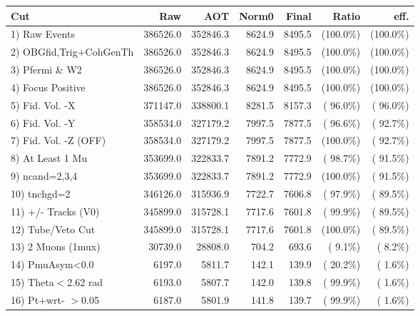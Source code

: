  \begin{table}[h!]\centering
 \begin{tabular}{||l||r|r|r|r|r|r||}
 \hline
 \hline
 Cut & Raw & AOT & Norm0 & Final & Ratio & eff.       \\
 \hline
  1) Raw Events           &     386526.0 &     352846.3 &       8624.9 &       8495.5 & (100.0\%) & (100.0\%) \\
  2) OBGfid,Trig+CohGenTh &     386526.0 &     352846.3 &       8624.9 &       8495.5 & (100.0\%) & (100.0\%) \\
  3) Pfermi \& W2         &     386526.0 &     352846.3 &       8624.9 &       8495.5 & (100.0\%) & (100.0\%) \\
  4) Focus Positive       &     386526.0 &     352846.3 &       8624.9 &       8495.5 & (100.0\%) & (100.0\%) \\
  5) Fid. Vol. -X         &     371147.0 &     338800.1 &       8281.5 &       8157.3 & ( 96.0\%) & ( 96.0\%) \\
  6) Fid. Vol. -Y         &     358534.0 &     327179.2 &       7997.5 &       7877.5 & ( 96.6\%) & ( 92.7\%) \\
  7) Fid. Vol. -Z (OFF)   &     358534.0 &     327179.2 &       7997.5 &       7877.5 & (100.0\%) & ( 92.7\%) \\
  8) At Least 1 Mu        &     353699.0 &     322833.7 &       7891.2 &       7772.9 & ( 98.7\%) & ( 91.5\%) \\
  9) ncand=2,3,4          &     353699.0 &     322833.7 &       7891.2 &       7772.9 & (100.0\%) & ( 91.5\%) \\
 10) tnchgd=2             &     346126.0 &     315936.9 &       7722.7 &       7606.8 & ( 97.9\%) & ( 89.5\%) \\
 11) +/- Tracks (V0)      &     345899.0 &     315728.1 &       7717.6 &       7601.8 & ( 99.9\%) & ( 89.5\%) \\
 12) Tube/Veto Cut        &     345899.0 &     315728.1 &       7717.6 &       7601.8 & (100.0\%) & ( 89.5\%) \\
 13) 2 Muons (1mux)       &      30739.0 &      28808.0 &        704.2 &        693.6 & (  9.1\%) & (  8.2\%) \\
 14) PmuAsym<0.0          &       6197.0 &       5811.7 &        142.1 &        139.9 & ( 20.2\%) & (  1.6\%) \\
 15) Theta$<$2.62 rad     &       6193.0 &       5807.7 &        142.0 &        139.8 & ( 99.9\%) & (  1.6\%) \\
 16) Pt+wrt- $>$0.05      &       6187.0 &       5801.9 &        141.8 &        139.7 & ( 99.9\%) & (  1.6\%) \\

\end{tabular}
\end{table}
